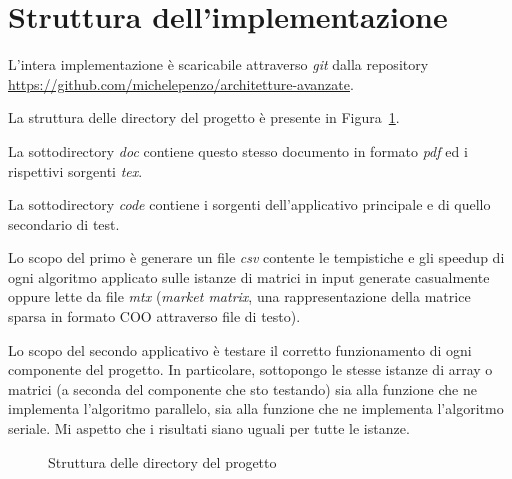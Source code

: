 
\section{Struttura dell'implementazione}\label{struttura}

L'intera implementazione è scaricabile attraverso \emph{git} dalla repository \url{https://github.com/michelepenzo/architetture-avanzate}.

La struttura delle directory del progetto è presente in Figura~\ref{fig:struct}. 

La sottodirectory \emph{doc} contiene questo stesso documento in formato \emph{pdf} ed i rispettivi sorgenti \emph{tex}. 

La sottodirectory \emph{code} contiene i sorgenti dell'applicativo principale e di quello secondario di test. 

Lo scopo del primo è generare un file \emph{csv} contente le tempistiche e gli speedup di ogni algoritmo applicato sulle istanze di matrici in input generate casualmente oppure lette da file \emph{mtx} (\emph{market matrix}, una rappresentazione della matrice sparsa in formato COO attraverso file di testo). 

Lo scopo del secondo applicativo è testare il corretto funzionamento di ogni componente del progetto. In particolare, sottopongo le stesse istanze di array o matrici (a seconda del componente che sto testando) sia alla funzione che ne implementa l'algoritmo parallelo, sia alla funzione che ne implementa l'algoritmo seriale. Mi aspetto che i risultati siano uguali per tutte le istanze.

\begin{figure}
    \caption{Struttura delle directory del progetto}
    \label{fig:struct}
\end{figure}

